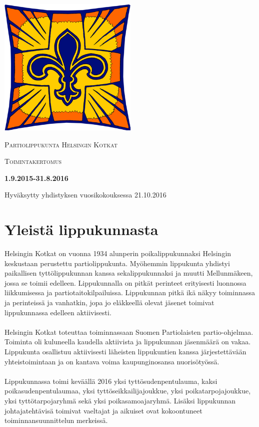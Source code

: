 \documentclass[a4paper, 12pt, finnish]{report} %
\begin{document}
\begin{titlepage}
	\centering
	\includegraphics[width=0.5\textwidth]{heko.png}\par\vspace{1cm}
	{\scshape\LARGE Partiolippukunta Helsingin Kotkat \par}
	\vspace{1cm}
	{\scshape\Large Toimintakertomus\par}
	\vspace{1.5cm}
	{\huge\bfseries 1.9.2015-31.8.2016\par}
	\vspace{2cm}
	\vfill
	\vfill
	{\large Hyväksytty yhdistyksen vuosikokouksessa 21.10.2016}
\end{titlepage}

\section{Yleistä lippukunnasta}
Helsingin Kotkat on vuonna 1934 alunperin poikalippukunnaksi Helsingin keskustaan perustettu partiolippukunta. Myöhemmin lippukunta yhdistyi paikallisen tyttölippukunnan kanssa sekalippukunnaksi ja muutti Mellunmäkeen, jossa se toimii edelleen. Lippukunnalla on pitkät perinteet erityisesti luonnossa liikkumisessa ja partiotaitokilpailuissa. Lippukunnan pitkä ikä näkyy toiminnassa ja perinteissä ja vanhatkin, jopa jo eläkkeellä olevat jäsenet toimivat lippukunnassa edelleen aktiivisesti.\\
\\Helsingin Kotkat toteuttaa toiminnassaan Suomen Partiolaisten partio-ohjelmaa. Toiminta oli kuluneella kaudella aktiivista ja lippukunnan jäsenmäärä on vakaa. Lippukunta osallistuu aktiivisesti läheisten lippukuntien kanssa järjestettävään yhteistoimintaan ja on kantava voima kaupunginosansa nuorisötyössä.\\
\\Lippukunnassa toimi keväällä 2016 yksi tyttösudenpentulauma, kaksi poikasudenpentulaumaa, yksi tyttöseikkailijajoukkue, yksi poikatarpojajoukkue, yksi tyttötarpojaryhmä sekä yksi poikasamoajaryhmä. Lisäksi lippukunnan johtajatehtävisä toimivat vaeltajat ja aikuiset ovat kokoontuneet toiminnansuunnittelun merkeissä.
\newpage
\end{document}

